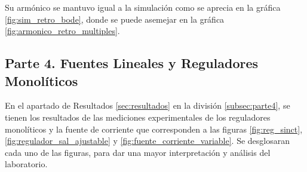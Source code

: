 \begin{itemize}
                Su armónico se mantuvo igual a la simulación como se aprecia en la gráfica \ref{fig:sim_retro_bode}, donde se puede asemejar en la gráfica \ref{fig:armonico_retro_multiples}.
        \end{itemize}

        
    \subsection{Parte 4. Fuentes Lineales y Reguladores Monolíticos}

        
        En el apartado de Resultados \ref{sec:resultados} en la división \ref{subsec:parte4}, se tienen los resultados de las mediciones experimentales de los reguladores monolíticos y la fuente de corriente que corresponden a las figuras \ref{fig:reg_sinct}, \ref{fig:regulador_sal_ajustable} y \ref{fig:fuente_corriente_variable}. Se desglosaran cada uno de las figuras, para dar una mayor interpretación y análisis del laboratorio.

        

